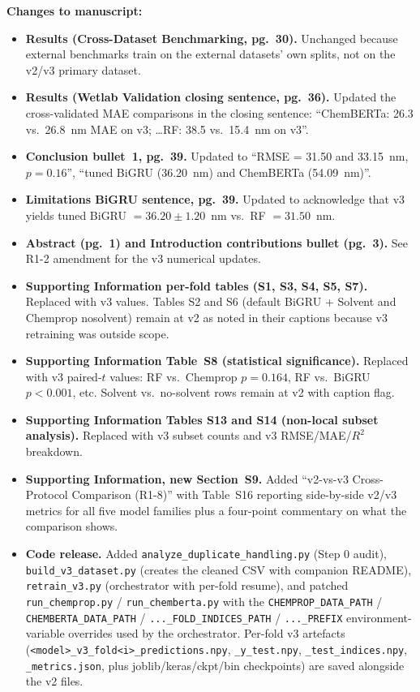 \documentclass[11pt]{article}
\newenvironment{changes}{%
  \noindent\textbf{Changes to manuscript:}
  \begin{itemize}[leftmargin=2em,itemsep=2pt]}{%
  \end{itemize}\medskip}
\begin{document}
\begin{changes}
  \item \textbf{Results (Cross-Dataset Benchmarking, pg.\ 30).} Unchanged because external benchmarks train on the external datasets' own splits, not on the v2/v3 primary dataset.
  \item \textbf{Results (Wetlab Validation closing sentence, pg.\ 36).} Updated the cross-validated MAE comparisons in the closing sentence: ``ChemBERTa: 26.3 vs.\ 26.8~nm MAE on v3; \ldots RF: 38.5 vs.\ 15.4~nm on v3''.
  \item \textbf{Conclusion bullet~1, pg.\ 39.} Updated to ``RMSE = 31.50 and 33.15~nm, $p = 0.16$'', ``tuned BiGRU (36.20~nm) and ChemBERTa (54.09~nm)''.
  \item \textbf{Limitations BiGRU sentence, pg.\ 39.} Updated to acknowledge that v3 yields tuned BiGRU $= 36.20 \pm 1.20$~nm vs.\ RF $= 31.50$~nm.
  \item \textbf{Abstract (pg.\ 1) and Introduction contributions bullet (pg.\ 3).} See R1-2 amendment for the v3 numerical updates.
  \item \textbf{Supporting Information per-fold tables (S1, S3, S4, S5, S7).} Replaced with v3 values. Tables S2 and S6 (default BiGRU + Solvent and Chemprop nosolvent) remain at v2 as noted in their captions because v3 retraining was outside scope.
  \item \textbf{Supporting Information Table~S8 (statistical significance).} Replaced with v3 paired-$t$ values: RF vs.\ Chemprop $p = 0.164$, RF vs.\ BiGRU $p < 0.001$, etc. Solvent vs.\ no-solvent rows remain at v2 with caption flag.
  \item \textbf{Supporting Information Tables S13 and S14 (non-local subset analysis).} Replaced with v3 subset counts and v3 RMSE/MAE/$R^2$ breakdown.
  \item \textbf{Supporting Information, new Section~S9.} Added ``v2-vs-v3 Cross-Protocol Comparison (R1-8)'' with Table~S16 reporting side-by-side v2/v3 metrics for all five model families plus a four-point commentary on what the comparison shows.
  \item \textbf{Code release.} Added \texttt{analyze\_duplicate\_handling.py} (Step 0 audit), \texttt{build\_v3\_dataset.py} (creates the cleaned CSV with companion README), \texttt{retrain\_v3.py} (orchestrator with per-fold resume), and patched \texttt{run\_chemprop.py} / \texttt{run\_chemberta.py} with the \texttt{CHEMPROP\_DATA\_PATH} / \texttt{CHEMBERTA\_DATA\_PATH} / \texttt{...\_FOLD\_INDICES\_PATH} / \texttt{...\_PREFIX} environment-variable overrides used by the orchestrator. Per-fold v3 artefacts (\texttt{<model>\_v3\_fold<i>\_predictions.npy}, \texttt{\_y\_test.npy}, \texttt{\_test\_indices.npy}, \texttt{\_metrics.json}, plus joblib/keras/ckpt/bin checkpoints) are saved alongside the v2 files.
\end{changes}
\end{document}
